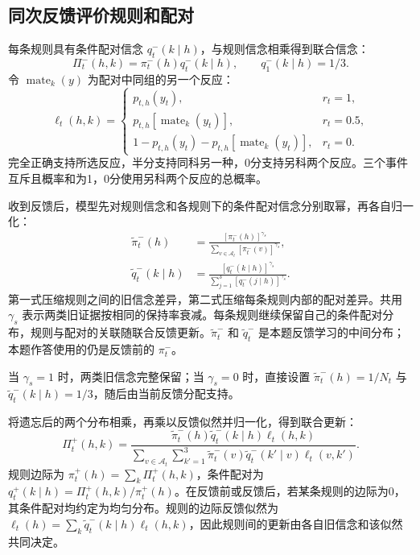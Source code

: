 \documentclass[12pt]{article}
\begin{document}
\subsection{同次反馈评价规则和配对}

每条规则具有条件配对信念 $q_t^-(k\mid h)$，与规则信念相乘得到联合信念：
\begin{equation}
\Pi_t^-(h,k)=\pi_t^-(h)q_t^-(k\mid h),\qquad q_1^-(k\mid h)=1/3.
\end{equation}
令 $\operatorname{mate}_k(y)$ 为配对中同组的另一个反应：
\begin{equation}
\ell_t(h,k)=
\begin{cases}
p_{t,h}(y_t),&r_t=1,\\
p_{t,h}[\operatorname{mate}_k(y_t)],&r_t=0.5,\\
1-p_{t,h}(y_t)-p_{t,h}[\operatorname{mate}_k(y_t)],&r_t=0.
\end{cases}
\label{eq:ternary-feedback}
\end{equation}
完全正确支持所选反应，半分支持同科另一种，0分支持另科两个反应。三个事件互斥且概率和为1，0分使用另科两个反应的总概率。

收到反馈后，模型先对规则信念和各规则下的条件配对信念分别取幂，再各自归一化：
\begin{align}
\widetilde\pi_t^-(h)&=
\frac{[\pi_t^-(h)]^{\gamma_s}}
{\sum_{v\in\mathcal A_t}[\pi_t^-(v)]^{\gamma_s}},
\label{eq:discounted-rule}\\
\widetilde q_t^-(k\mid h)&=
\frac{[q_t^-(k\mid h)]^{\gamma_s}}
{\sum_{j=1}^{3}[q_t^-(j\mid h)]^{\gamma_s}}.
\label{eq:discounted-pairing}
\end{align}
第一式压缩规则之间的旧信念差异，第二式压缩每条规则内部的配对差异。共用 $\gamma_s$ 表示两类旧证据按相同的保持率衰减。每条规则继续保留自己的条件配对分布，规则与配对的关联随联合反馈更新。$\widetilde\pi_t^-$ 和 $\widetilde q_t^-$ 是本题反馈学习的中间分布；本题作答使用的仍是反馈前的 $\pi_t^-$。

当 $\gamma_s=1$ 时，两类旧信念完整保留；当 $\gamma_s=0$ 时，直接设置 $\widetilde\pi_t^-(h)=1/N_t$ 与 $\widetilde q_t^-(k\mid h)=1/3$，随后由当前反馈分配支持。

将遗忘后的两个分布相乘，再乘以反馈似然并归一化，得到联合更新：
\begin{equation}
\Pi_t^+(h,k)=
\frac{\widetilde\pi_t^-(h)\widetilde q_t^-(k\mid h)\ell_t(h,k)}
{\sum_{v\in \mathcal A_t}\sum_{k'=1}^3\widetilde\pi_t^-(v)\widetilde q_t^-(k'\mid v)\ell_t(v,k')}.
\label{eq:joint-memory}
\end{equation}
规则边际为 $\pi_t^+(h)=\sum_k\Pi_t^+(h,k)$，条件配对为 $q_t^+(k\mid h)=\Pi_t^+(h,k)/\pi_t^+(h)$。在反馈前或反馈后，若某条规则的边际为0，其条件配对均约定为均匀分布。规则的边际反馈似然为 $\ell_t(h)=\sum_k\widetilde q_t^-(k\mid h)\ell_t(h,k)$，因此规则间的更新由各自旧信念和该似然共同决定。
\end{document}
